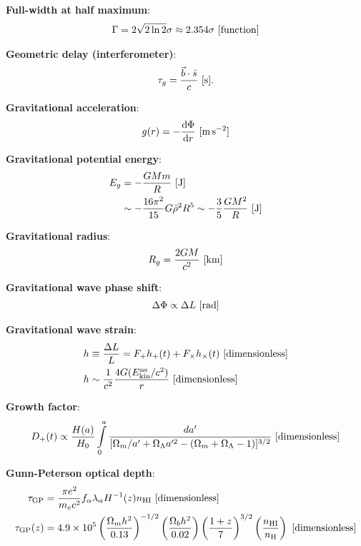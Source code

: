 \documentclass[a4paper,10pt]{article}
\begin{document}
{\noindent}\textbf{Full-width at half maximum}:
\begin{align*}
    \Gamma=2\sqrt{2\ln2}\sigma \approx 2.354\sigma ~ [{\rm function}]
\end{align*}

{\noindent}\textbf{Geometric delay (interferometer)}:
\begin{align*}
    \tau_g = \frac{\vec{b}\cdot\hat{s}}{c} ~ [{\rm s}].
\end{align*}

{\noindent}\textbf{Gravitational acceleration}:
\begin{align*}
    g(r) = -\frac{{\rm d}\Phi}{{\rm d}r} ~ [{\rm m\,s^{-2}}]
\end{align*}

{\noindent}\textbf{Gravitational potential energy}:
\begin{align*}
    E_g &= -\frac{GMm}{R} ~ [{\rm J}] \\
    &\sim -\frac{16\pi^2}{15}G\bar{\rho}^2R^5 \sim -\frac{3}{5}\frac{GM^2}{R} ~ [{\rm J}]
\end{align*}

{\noindent}\textbf{Gravitational radius}:
\begin{align*}
    R_g = \frac{2GM}{c^2} ~ [{\rm km}]
\end{align*}

{\noindent}\textbf{Gravitational wave phase shift}:
\begin{align*}
    \Delta\Phi \propto \Delta L ~ [{\rm rad}]
\end{align*}

{\noindent}\textbf{Gravitational wave strain}:
\begin{align*}
    h &\equiv \frac{\Delta L}{L} = F_+h_+(t) + F_\times h_\times(t) ~ [{\rm dimensionless}] \\
    h &\sim \frac{1}{c^2} \frac{4G(E_{\rm kin}^{\rm ns}/c^2)}{r}  ~ [{\rm dimensionless}]
\end{align*}

{\noindent}\textbf{Growth factor}:
\begin{align*}
    D_+(t) \propto \frac{H(a)}{H_0}\int\limits_0^a \frac{da'}{[\Omega_m/a'+\Omega_\Lambda a'^2-(\Omega_m+\Omega_\Lambda-1)]^{3/2}} ~ [{\rm dimensionless}]
\end{align*}

{\noindent}\textbf{Gunn-Peterson optical depth}:
\begin{align*}
    \tau_\mathrm{GP} &= \frac{\pi e^2}{m_ec^2}f_\alpha\lambda_\alpha H^{-1}(z)n_\mathrm{HI} ~ [{\rm dimensionless}] \\
    \tau_\mathrm{GP}(z) &= 4.9\times10^5 \left(\frac{\Omega_mh^2}{0.13}\right)^{-1/2} \left(\frac{\Omega_bh^2}{0.02}\right) \left(\frac{1+z}{7}\right)^{3/2} \left(\frac{n_\mathrm{HI}}{n_\mathrm{H}}\right) ~ [{\rm dimensionless}]
\end{align*}
\end{document}
